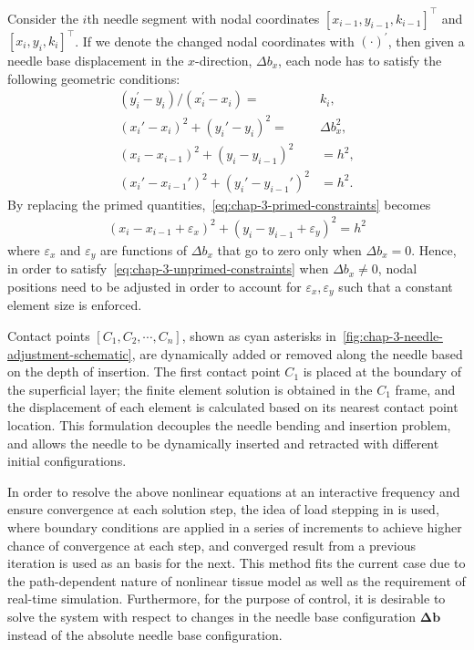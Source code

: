 Consider the $i$th needle segment with nodal coordinates $[x_{i - 1}, y_{i - 1}, k_{i - 1}]^{\top}$ and $[x_i, y_i, k_i]^{\top}$. If we denote the changed nodal coordinates with $(\cdot)^{\prime}$, then given a needle base displacement in the $x$-direction, $\Delta b_x$, each node has to satisfy the following geometric conditions:
\begin{align}
  \left( y_i^{\prime} - y_i \right)/ \left( x_i^{\prime} - x_i \right) = &k_i, \\
  \label{eq:chap-3-position-increment-constraint}
  \left( x_i' - x_i \right)^2 + \left( y_i' - y_i\right)^2 =& \Delta b_x^2, \\
  \label{eq:chap-3-unprimed-constraints}
  \left( x_i - x_{i - 1} \right)^2 + \left( y_i - y_{i - 1}\right)^2 &= h^2, \\ 
  \left( x_i' - x_{i - 1}' \right)^2 + \left( y_i' - y_{i - 1}'\right)^2 &= h^2. \label{eq:chap-3-primed-constraints}
\end{align}
By replacing the primed quantities,~\cref{eq:chap-3-primed-constraints} becomes
\begin{equation}
  \begin{split}
    \label{eq:chap-3-element-compatibility}
    \left(x_i - x_{i - 1} + \varepsilon_x \right)^2 + \left(y_i - y_{i - 1} + \varepsilon_y \right)^2 = h^2
  \end{split}
\end{equation}
where $\varepsilon_x$ and $\varepsilon_y$ are functions of $\Delta b_x$ that go to zero only when $\Delta b_x = 0$. Hence, in order to satisfy~\cref{eq:chap-3-unprimed-constraints} when $\Delta b_x \neq 0$, nodal positions need to be adjusted in order to account for $\varepsilon_x, \varepsilon_y$ such that a constant element size is enforced.

Contact points $\left[  C_1, C_2, \cdots, C_n \right]$, shown as cyan asterisks in~\cref{fig:chap-3-needle-adjustment-schematic}, are dynamically added or removed along the needle based on the depth of insertion. The first contact point $C_1$ is placed at the boundary of the superficial layer; the finite element solution is obtained in the $C_1$ frame, and the displacement of each element is calculated based on its nearest contact point location. This formulation decouples the needle bending and insertion problem, and allows the needle to be dynamically inserted and retracted with different initial configurations.

In order to resolve the above nonlinear equations at an interactive frequency and ensure convergence at each solution step, the idea of load stepping in is used, where boundary conditions are applied in a series of increments to achieve higher chance of convergence at each step, and converged result from a previous iteration is used as an basis for the next. This method fits the current case due to the path-dependent nature of nonlinear tissue model as well as the requirement of real-time simulation. Furthermore, for the purpose of control, it is desirable to solve the system with respect to changes in the needle base configuration $\boldsymbol\Delta \mathbf{b}$ instead of the absolute needle base configuration.

